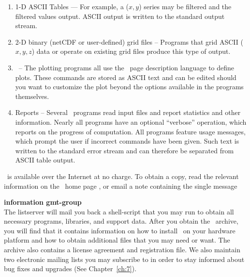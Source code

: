 \begin{enumerate}

\item{1-D ASCII Tables --- For example, a ($x,y$) series may be filtered and
the filtered values output.  ASCII output is written to the standard output stream.} 

\item{2-D binary (netCDF or user-defined) grid files -- Programs that grid
ASCII ($x,y,z$) data or operate on existing grid files produce this type of output.} 

\item{\PS\ -- The plotting programs all use the \PS\
page description language to define plots.  These commands are stored as ASCII
text and can be edited should you want to customize the plot beyond the options
available in the programs themselves.} 

\item{Reports -- Several \GMT\ programs read input files and report statistics
and other information.  Nearly all programs have an optional ``verbose''
operation, which reports on the progress of computation.  All programs feature
usage messages, which prompt the user if incorrect commands have been given.
Such text is written to the standard error stream and can therefore be
separated from ASCII table output.} 

\end{enumerate} 

\GMT\ is available over the Internet at no charge.  To obtain a copy, read
the relevant information on the \GMT\ home page \GMTSITE,
or email
a note containing the single message \\ 

\textbf{information gmt-group} \\

The listserver will mail you back a shell-script that you may run to obtain
all necessary programs, libraries, and support data.  After you obtain the
\GMT\ archive, you will find that it contains information on how to install
\GMT\ on your hardware platform and how to obtain additional files that you
may need or want.  The archive also contains a license agreement and
registration file.  We also maintain two electronic mailing lists you may
subscribe to in order to stay informed about bug fixes and upgrades (See
Chapter~\ref{ch:7}).


